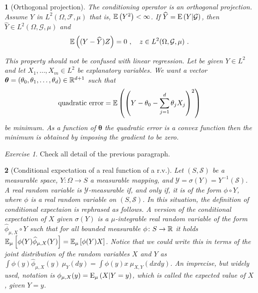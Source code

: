 \documentclass[12pt,a4paper]{amsart}
\theoremstyle{plain}%
\newtheorem{npar}{}%
\theoremstyle{definition}
\theoremstyle{remark}
\newtheorem{exercise}{Exercise}
\begin{document}
\begin{npar}[Orthogonal projection] \normalfont The conditioning operator is an \emph{orthogonal projection}. Assume $Y$ in $L^2(\Omega,\mathcal F,\mu)$ that is, $\operatorname{\mathbb E}\left(Y^2\right) < \infty$. If $\widehat Y = \operatorname{E}\left(Y \middle| \mathcal G\right)$, then $\widehat Y \in L^2(\Omega,\mathcal G,\mu)$ and
  \begin{equation*}
    \operatorname{\mathbb E}\left((Y-\widehat Y)Z\right) = 0 \ , \quad z \in L^2(\Omega,\mathcal G,\mu) \ .
  \end{equation*}

This property should not be confused with \emph{linear regression}. Let be given $Y \in L^2$ and let $X_1,\dots,X_m \in L^2$ be \emph{explanatory variables}. We want a vector $\bm \theta = (\theta_0,\theta_1,\dots,\theta_d) \in \mathbb{R}^{d+1}$ such that
\begin{equation*}
  \text{quadratic error} = \operatorname{\mathbb E}\left(\left(Y - \theta_0 - \sum_{j=1}^d \theta_j X_j\right)^2\right)
\end{equation*}
be minimum. As a function of $\bm \theta$ the quadratic error is a convex function then the minimum is obtained by imposing the gradient to be zero.
\end{npar}

\begin{exercise}
Check all detail of the previous paragraph.  
\end{exercise}

\begin{npar}[Conditional expectation of a real function of a r.v.] \normalfont
  Let $(S,\mathcal S)$ be a measurable space, $Y \colon \Omega \to S$ a measurable mapping, and $\mathcal Y = \sigma(Y) = Y^{-1}(\mathcal S)$. A real random variable is $\mathcal Y$-measurable if, and only if, it is of the form $\phi \circ Y$, where $\phi$ is a real random variable on $(S,\mathcal S)$. In this situation, the definition of conditional expectaion is rephrased as follows. A version of the conditional expectation of $X$ given $\sigma(Y)$ is a $\mu$-integrable real random variable of the form $\widehat \phi_{\mu,X} \circ Y$ such that for all bounded measurable $\phi \colon S \to \mathbb{R}$ it holds $\operatorname{\mathbb E}_{\mu}\left[\phi(Y)\widehat \phi_{\mu,X}(Y)\right] = \operatorname{\mathbb E}_{\mu}\left[\phi(Y) X\right]$. Notice that we could write this in terms of the joint distribution of the random variables $X$ and $Y$ as $\int \phi(y) \widehat \phi_{\mu,X}(y) \ \mu_Y(dy) = \int \phi(y)x \ \mu_{X,Y}(dxdy)$. An imprecise, but widely used, notation is $\phi_{\mu,X}(y) = \operatorname{E}_{\mu}\left(X \middle| Y=y\right)$, which is called the \emph{expected value of $X$, given $Y=y$}.
\end{npar}
\end{document}

